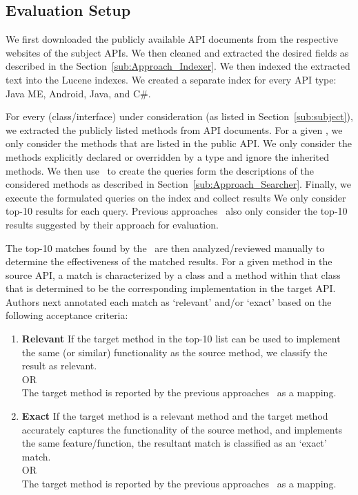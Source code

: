 \subsection{Evaluation Setup}


We first downloaded the publicly available API documents from the respective websites of the subject APIs. We then cleaned and extracted the desired fields as described in the Section~\ref{sub:Approach_Indexer}. We then indexed the extracted text into the Lucene indexes.
We created a separate index for every API type: Java ME, Android, Java, and C\#. 


For every  (class/interface) under consideration (as listed in Section~\ref{sub:subject}),
we extracted the publicly listed methods from API documents.
For a given , we only consider the methods that are listed in the public API.
We only consider the methods explicitly declared or overridden by a type and ignore the inherited methods.
We then use \tool\ to create the queries form the descriptions of the considered methods as described in Section~\ref{sub:Approach_Searcher}.
Finally, we execute the formulated queries on the index and collect results
We only consider top-10 results for each query.
Previous approaches~\cite{chatterjee2009sniff,Gokhale2013ICSE}
also only consider the top-10 results suggested by their approach for evaluation.



The top-10 matches found by the \tool\ are then analyzed/reviewed manually to determine the effectiveness of the matched results.
For a given method in the source API, a match is characterized by a class and a method within that class that is determined to be the corresponding implementation in the target API.
Authors next annotated each match as `relevant' and/or `exact' based on the following acceptance criteria:
\begin{enumerate}
	\item{\textbf{Relevant}} If the target method in the top-10 list can be used to implement the same (or similar) functionality as the source method, we classify the result as relevant.\\
	OR\\
	The target method is reported by the previous approaches~\cite{Gokhale2013ICSE,nguyen2014statistical} as a mapping.

	\item{\textbf{Exact}} If the target method is a relevant method and the target method accurately captures the functionality of the source method, and implements the same feature/function, the resultant match is classified as an `exact' match.\\
	OR\\
	The target method is reported by the previous approaches~\cite{Gokhale2013ICSE,nguyen2014statistical} as a mapping.
\end{enumerate}

